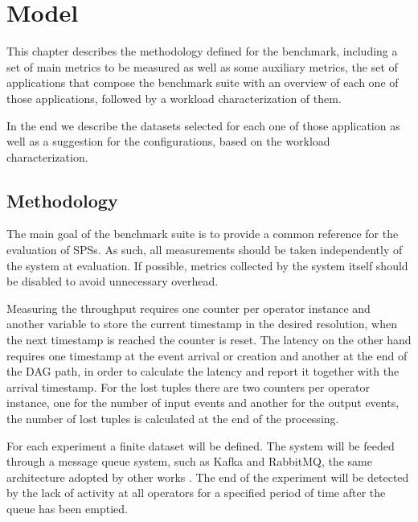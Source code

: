 \documentclass[ppgc,diss,english]{iiufrgs}
\begin{document}
\chapter{Model}
\label{chapter:model}

This chapter describes the methodology defined for the benchmark, including a set of main metrics to be measured as well as some auxiliary metrics, the set of applications that compose the benchmark suite with an overview of each one of those applications, followed by a workload characterization of them.

In the end we describe the datasets selected for each one of those application as well as a suggestion for the configurations, based on the workload characterization.

\section{Methodology}
\label{sec:methodology}

%
%
%

The main goal of the benchmark suite is to provide a common reference for the evaluation of SPSs. As such, all measurements should be taken independently of the system at evaluation. If possible, metrics collected by the system itself should be disabled to avoid unnecessary overhead.

Measuring the throughput requires one counter per operator instance and another variable to store the current timestamp in the desired resolution, when the next timestamp is reached the counter is reset. The latency on the other hand requires one timestamp at the event arrival or creation and another at the end of the DAG path, in order to calculate the latency and report it together with the arrival timestamp. For the lost tuples there are two counters per operator instance, one for the number of input events and another for the output events, the number of lost tuples is calculated at the end of the processing.


For each experiment a finite dataset will be defined. The system will be feeded through a message queue system, such as Kafka and RabbitMQ, the same architecture adopted by other works \cite{chardonnens2013big, lim2013execution, wang2013cluster, sawant2013big}. The end of the experiment will be detected by the lack of activity at all operators for a specified period of time after the queue has been emptied.
\end{document}
